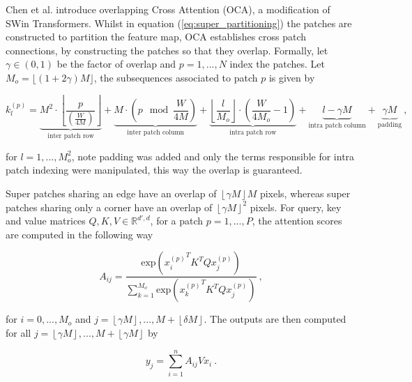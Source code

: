 Chen et al. \cite{chenHATHybridAttention2024} introduce overlapping Cross Attention (OCA),
a modification of SWin Transformers.
Whilst in equation (\ref{eq:super_partitioning}) the patches are constructed to partition the feature map,
OCA establishes cross patch connections,
by constructing the patches so that they overlap.
Formally, let $\gamma \in (0, 1)$ be the factor of overlap and $p = 1, ..., N$ index the patches.
Let $M_o = \lfloor (1 + 2\gamma)M \rfloor$, the subsequences associated to patch $p$ is given by

\begin{equation} \label{eq:oca_partitioning}
    k_l^{(p)} = \underbrace{M^2 \cdot \left \lfloor \frac{p}{\left( \frac{W}{4M} \right)}\right \rfloor}_\text{inter patch row}
        + \underbrace{M \cdot \left( p \mod \frac{W}{4M} \right)}_\text{inter patch column}
        + \underbrace{\left \lfloor \frac{l}{M_o}\right \rfloor \cdot \left( \frac{W}{4M_o} - 1 \right)}_\text{intra patch row}
        + \underbrace{l - \gamma M}_\text{intra patch column} 
        + \underbrace{\gamma M}_\text{padding} ~,
\end{equation}

for $l = 1, ..., M_o^2$, note padding was added and only the terms responsible for intra patch indexing were manipulated,
this way the overlap is guaranteed.

\noindent Super patches sharing an edge have an overlap of $\left \lfloor \gamma M \right \rfloor M$ pixels,
whereas super patches sharing only a corner have an overlap of $ \left \lfloor \gamma M \right \rfloor^2$ pixels.
For query, key and value matrices $Q, K, V \in \mathbb R^{d', d}$, 
for a patch $p = 1, ..., P$, 
the attention scores are computed in the following way

    \begin{equation} \label{eq:oca1}
        A_{ij} = \frac{\text{exp}({x_{i}^{(p)}}^T K^T Q x_{j}^{(p)})}{\sum_{k = 1}^{M_o} \text{exp}({x_{k}^{(p)}}^T K^T Q x_{j}^{(p)})} ~,
    \end{equation}

for $i = 0, ..., M_o$
and $j = \left \lfloor \gamma M \right \rfloor, ..., M + \left \lfloor \delta M \right \rfloor$.
The outputs are then computed for all $j = \left \lfloor \gamma M \right \rfloor, ..., M + \left \lfloor \gamma M \right \rfloor$ by 

    \begin{equation} \label{eq:oca2}
        y_{j} = \sum_{i=1}^n A_{ij} V x_{i} ~.
    \end{equation}

